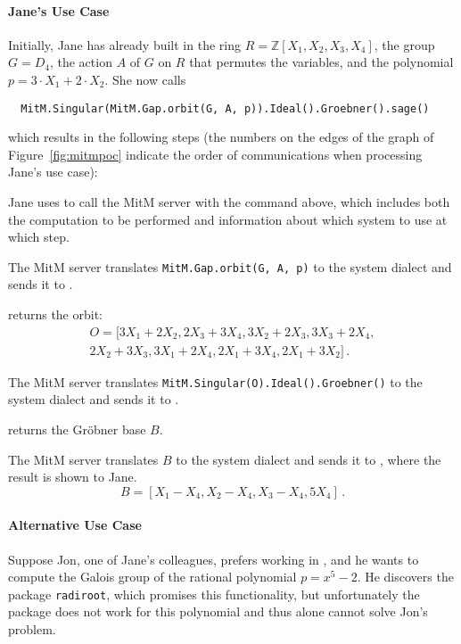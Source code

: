 \paragraph{Jane's Use Case} 
Initially, Jane has already built in \Sage the ring $R=\mathbb{Z}[X_1,X_2,X_3,X_4]$, the group $G=D_4$, the action $A$ of $G$ on $R$ that permutes the variables, and the polynomial $p = 3\cdot X_1 + 2\cdot X_2$.  She now calls
\begin{lstlisting}
  MitM.Singular(MitM.Gap.orbit(G, A, p)).Ideal().Groebner().sage()
\end{lstlisting}
which results in the following steps (the numbers on the edges of the
graph of Figure~\ref{fig:mitmpoc} indicate the order of communications when processing Jane's use case):
\begin{compactenum}
  \item Jane uses \Sage to call the MitM server with the command above, which includes both the computation to be performed and information about which system to use at which step.
  \item The MitM server translates \lstinline|MitM.Gap.orbit(G, A, p)| to the \GAP system dialect and sends it to \GAP.
  \item \GAP returns the orbit:
    \begin{displaymath}
      \begin{split}
        O = [3X_1 + 2X_2, 2X_3 + 3X_4, 3X_2 + 2X_3, 3X_3 + 2X_4,\\
        2X_2 + 3X_3, 3X_1 + 2X_4, 2X_1 + 3X_4, 2X_1 + 3X_2]\,.
      \end{split}
    \end{displaymath}
  \item The MitM server translates \lstinline|MitM.Singular(O).Ideal().Groebner()| to the \Singular system dialect and sends it to \Singular.
  \item \Singular returns the Gröbner base $B$.
  \item The MitM server translates $B$ to the \Sage system dialect and sends it to \Sage, where the result is shown to Jane.
    \begin{displaymath}
      B = [X_1 - X_4, X_2 - X_4, X_3 - X_4, 5X_4]\,.
    \end{displaymath}
  \end{compactenum}

\paragraph{Alternative Use Case}
Suppose Jon, one of Jane's colleagues, prefers working in \GAP, and he wants to
compute the Galois group of the rational polynomial $p = x^5 - 2$. He discovers
the \GAP package \texttt{radiroot}, which promises this functionality, but
unfortunately the package does not work for this polynomial and thus \GAP alone
cannot solve Jon's problem.

